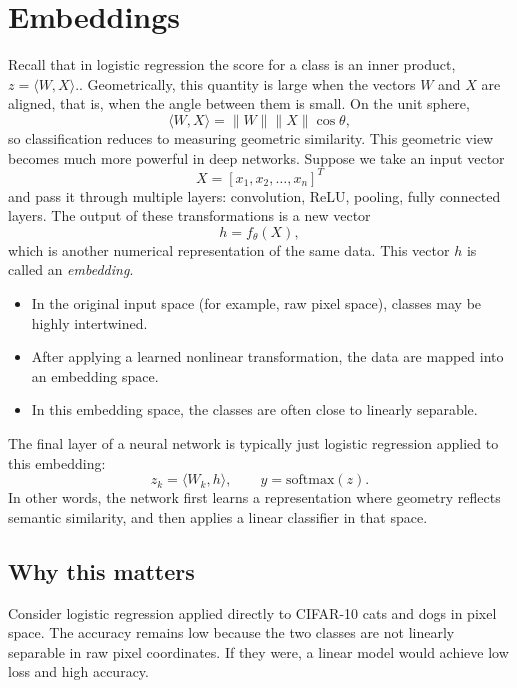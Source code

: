 \section{Embeddings}

\medskip

Recall that in logistic regression the score for a class is an inner product, $z = \langle W, X \rangle.$. Geometrically, this quantity is large when the vectors $W$ and $X$ are aligned, that is, when the angle between them is small. On the unit sphere,
\[
\langle W, X \rangle = \|W\| \|X\| \cos \theta,
\]
so classification reduces to measuring geometric similarity. This geometric view becomes much more powerful in deep networks. Suppose we take an input vector
\[
X = [x_1, x_2, \dots, x_n]^T
\]
and pass it through multiple layers: convolution, ReLU, pooling, fully connected layers. The output of these transformations is a new vector
\[
h = f_\theta(X),
\]
which is another numerical representation of the same data. This vector $h$ is called an \emph{embedding}.

\begin{itemize}
\item In the original input space (for example, raw pixel space), classes may be highly intertwined.
\item After applying a learned nonlinear transformation, the data are mapped into an embedding space.
\item In this embedding space, the classes are often close to linearly separable.
\end{itemize}

The final layer of a neural network is typically just logistic regression applied to this embedding:
\[
z_k = \langle W_k, h \rangle,
\qquad
y = \text{softmax}(z).
\]
In other words, the network first learns a representation where geometry reflects semantic similarity, and then applies a linear classifier in that space.

\bigskip

\subsection{Why this matters}

\medskip

Consider logistic regression applied directly to CIFAR-10 cats and dogs in pixel space.  
The accuracy remains low because the two classes are not linearly separable in raw pixel coordinates. If they were, a linear model would achieve low loss and high accuracy.

